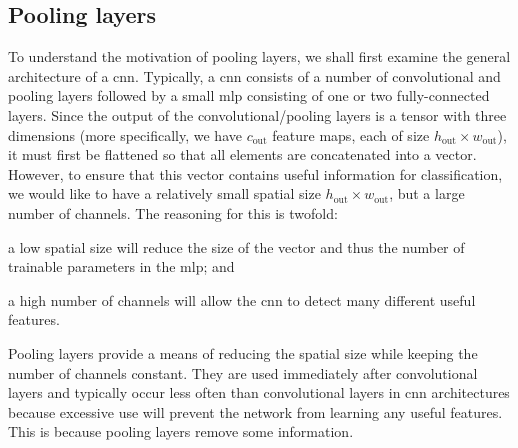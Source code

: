 \documentclass[../main.tex]{subfiles}
\begin{document}
\subsection{Pooling layers}
To understand the motivation of pooling layers, we shall first examine the general architecture of a \gls{cnn}.
Typically, a \gls{cnn} consists of a number of convolutional and pooling layers followed by a small \gls{mlp} consisting of one or two fully-connected layers.
Since the output of the convolutional/pooling layers is a tensor with three dimensions (more specifically, we have $c_\text{out}$ feature maps, each of size $h_\text{out} \times w_\text{out}$), it must first be flattened so that all elements are concatenated into a vector.
However, to ensure that this vector contains useful information for classification, we would like to have a relatively small spatial size $h_\text{out} \times w_\text{out}$, but a large number of channels. 
The reasoning for this is twofold:
\begin{enumerate*}[label=(\roman*)]
    \item a low spatial size will reduce the size of the vector and thus the number of trainable parameters in the \gls{mlp}; and
    \item a high number of channels will allow the \gls{cnn} to detect many different useful features. 
\end{enumerate*}
Pooling layers provide a means of reducing the spatial size while keeping the number of channels constant.
They are used immediately after convolutional layers and typically occur less often than convolutional layers in \gls{cnn} architectures because excessive use will prevent the network from learning any useful features.
This is because pooling layers remove some information.
\end{document}
